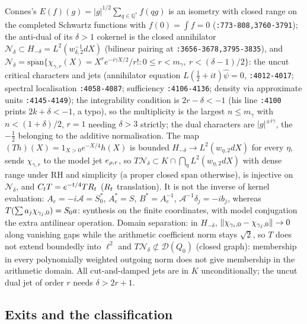 \begin{theorem}
\label{thm:connes-cokernel-cut-damp}
Connes's $E(f)(g) = |g|^{1/2}\sum_{q\in\mathbb Q^{*}}f(qg)$ is an isometry with closed range on the completed Schwartz functions with
$f(0) = \int f = 0$ (\texttt{:773-808,3760-3791}); the anti-dual of its $\delta>1$ cokernel is the closed annihilator
$\mathcal N_\delta\subset H_{-\delta} = L^2(w_{\delta,2}^{-1}dX)$ (bilinear pairing at \texttt{:3656-3678,3795-3835}), and
$\mathcal N_\delta = \overline{\mathrm{span}}\{\chi_{\gamma,r}(X) = X^re^{-i\gamma X/2}/r!: 0\le r<m_\gamma,\ r<(\delta-1)/2\}$: the uncut critical
characters and jets (annihilator equation $L(\tfrac12+it)\hat\psi = 0$, \texttt{:4012-4017}; spectral localisation \texttt{:4058-4087};
sufficiency \texttt{:4106-4136}; density via approximate units \texttt{:4145-4149}); the integrability condition is $2r-\delta<-1$ (his
line \texttt{:4100} prints $2k+\delta<-1$, a typo), so the multiplicity is the largest $n\le m_\gamma$ with $n<(1+\delta)/2$, $r = 1$ needing
$\delta>3$ strictly; the dual characters are $|g|^{\pm i\gamma}$, the $-\tfrac12$ belonging to the additive normalisation. The map
$(Th)(X) = 1_{X>0}e^{-X/4}h(X)$ is bounded $H_{-\delta}\to L^2(w_{\eta,2}dX)$ for every $\eta$, sends $\chi_{\gamma,r}$ to the model jet
$e_{\rho,r}$, so $T\mathcal N_\delta\subset K\cap\bigcap_\eta L^2(w_{\eta,2}dX)$ with dense range under RH and simplicity (a proper closed
span otherwise), is injective on $\mathcal N_\delta$, and $C_t T = e^{-t/4}TR_t$ ($R_t$ translation). It is not the inverse of kernel
evaluation: $A_e = -i\mathcal A = S_0^{*}$, $A_e^{*} = S$, $B^{*} = A_e^{-1}$, $\mathcal A^{-1}\delta_j = -ib_j$, whereas $T(\sum a_j\chi_{\gamma_{j},0}) = S_0a$:
synthesis on the finite coordinates, with model conjugation the extra antilinear operation. Domain separation: in $H_{-\delta}$,
$\|\chi_{\gamma_{i},0}-\chi_{\gamma_{j},0}\|\to0$ along vanishing gaps while the arithmetic coefficient norm stays $\sqrt2$, so $T$ does not extend
boundedly into $\ell^2$ and $T\mathcal N_\delta\not\subset\mathcal D(Q_0)$ (closed graph): membership in every polynomially weighted outgoing
norm does not give membership in the arithmetic domain. All cut-and-damped jets are in $K$ unconditionally; the uncut dual
jet of order $r$ needs $\delta>2r+1$.
\end{theorem}

\subsection{Exits and the classification}

